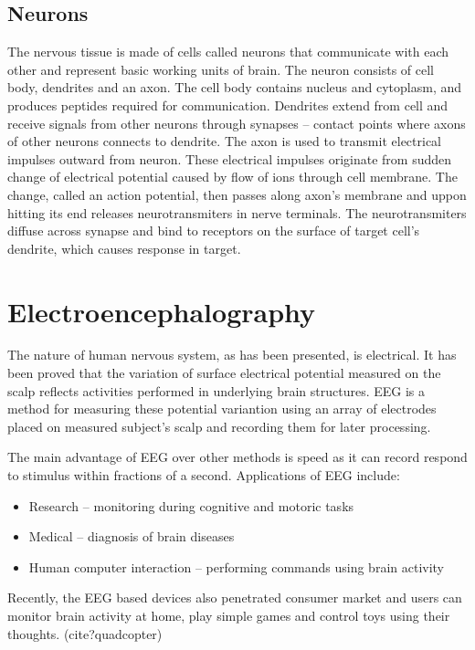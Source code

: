 \subsection{Neurons}
The nervous tissue is made of cells called neurons that communicate with each
other and represent basic working units of brain. The neuron consists of cell
body, dendrites and an axon. The cell body contains nucleus and cytoplasm, and
produces peptides required for communication. Dendrites extend from cell and
receive signals from other neurons through synapses -- contact points where
axons of other neurons connects to dendrite. The axon is used to transmit
electrical impulses outward from neuron. These electrical impulses originate
from sudden change of electrical potential caused by flow of ions through cell
membrane. The change, called an action potential, then passes along axon's
membrane and uppon hitting its end releases neurotransmiters in nerve terminals.
The neurotransmiters diffuse across synapse and bind to receptors on the surface
of target cell's dendrite, which causes response in target.\cite{brainFacts}


\section{Electroencephalography}
The nature of human nervous system, as has been presented, is electrical. It has
been proved that the variation of surface electrical potential measured on the
scalp reflects activities performed in underlying brain structures. EEG is a
method for measuring these potential variantion using an array of electrodes
placed on measured subject's scalp and recording them for later processing.
\cite{eegClass}

The main advantage of EEG over other methods is speed as it can record respond
to stimulus within fractions of a second. \cite{eegFund} Applications of EEG
include:
\begin{itemize}
  \item Research -- monitoring during cognitive and motoric tasks
  \item Medical -- diagnosis of brain diseases
  \item Human computer interaction -- performing commands using brain activity  
\end{itemize}
Recently, the EEG based devices also penetrated consumer market and users can
monitor brain activity at home, play simple games and control toys using
their thoughts. (cite?quadcopter)

